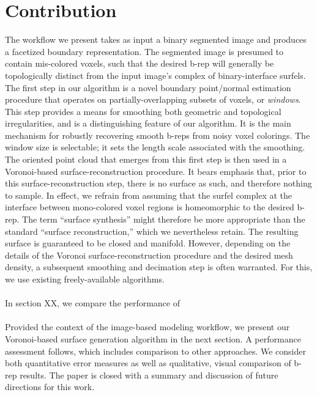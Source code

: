 \section{Contribution}

The workflow we present takes as input a binary segmented image and produces a facetized boundary representation.  The segmented image is presumed to contain mis-colored voxels, such that the desired b-rep will generally be topologically distinct from the input image's complex of binary-interface surfels.  The first step in our algorithm is a novel boundary point/normal estimation procedure that operates on partially-overlapping subsets of voxels, or {\em windows}.  This step provides a means for smoothing both geometric and topological irregularities, and is a distinguishing feature of our algorithm.  It is the main mechanism for robustly recovering smooth b-reps from noisy voxel colorings.  The window size is selectable; it sets the length scale associated with the smoothing.  The oriented point cloud that emerges from this first step is then used in a Voronoi-based surface-reconstruction procedure.  It bears emphasis that, prior to this surface-reconstruction step, there is no surface as such, and therefore nothing to sample.  In effect, we refrain from assuming that the surfel complex at the interface between mono-colored voxel regions is homeomorphic to the desired b-rep.  The term ``surface synthesis'' might therefore be more appropriate than the standard ``surface reconstruction,'' which we nevertheless retain. The resulting surface is guaranteed to be closed and manifold.  However, depending on the details of the Voronoi surface-reconstruction procedure and the desired mesh density, a subsequent smoothing and decimation step is often warranted.  For this, we use existing freely-available algorithms. \\ \\
%
In section XX, we compare the performance of \\ \\
%
Provided the context of the image-based modeling workflow, we present our Voronoi-based surface generation algorithm in the next section. A performance assessment follows, which includes comparison to other approaches.  We consider both quantitative error measures as well as qualitative, visual comparison of b-rep results.  The paper is closed with a summary and discussion of future directions for this work.